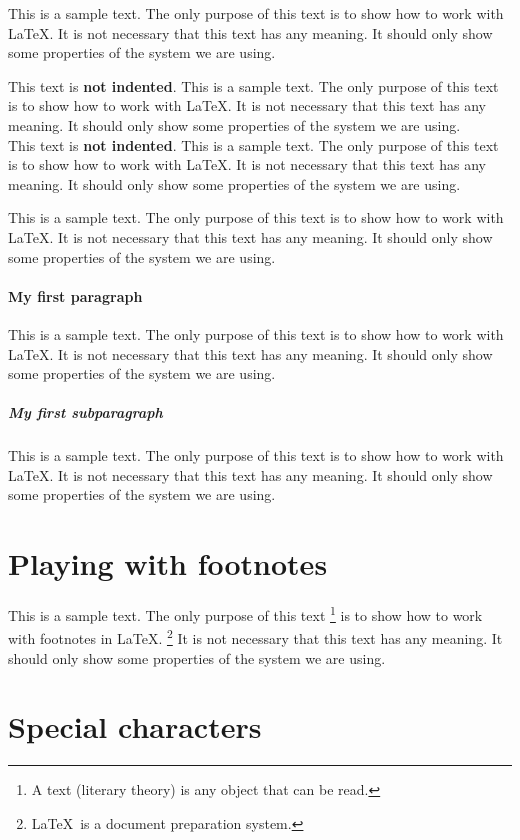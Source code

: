 \documentclass[10pt, paper=a4, abstracton]{scrartcl}
\begin{document}
This is a sample text. The only purpose of this text is to show how to work with \LaTeX . It is not necessary that this text has any meaning. It should only show some properties of the system we are using. 

\noindent This text is \textbf{not indented}. This is a sample text. The only purpose of this text is to show how to work with \LaTeX . It is not necessary that this text has any meaning. It should only show some properties of the system we are using. \\
This text is \textbf{not indented}. This is a sample text. The only purpose of this text is to show how to work with \LaTeX . It is not necessary that this text has any meaning. It should only show some properties of the system we are using. 

This is a sample text. The only purpose of this text is to show how to work with \LaTeX . It is not necessary that this text has any meaning. It should only show some properties of the system we are using. 


\paragraph[First paragraph]{My first paragraph}

This is a sample text. The only purpose of this text is to show how to work with \LaTeX . It is not necessary that this text has any meaning. It should only show some properties of the system we are using. 


\subparagraph[First subparagraph]{My first subparagraph}

This is a sample text. The only purpose of this text is to show how to work with \LaTeX . It is not necessary that this text has any meaning. It should only show some properties of the system we are using. 


\section[Footnotes]{Playing with footnotes}

This is a sample text. The only purpose of this text%
%
\footnote{A text (literary theory) is any object that can be read.} %
%
is to show how to work with footnotes in \LaTeX .%
%
\footnote{\LaTeX\ is a document preparation system.} %
%
It is not necessary that this text has any meaning. It should only show some properties of the system we are using. 


\section{Special characters}
\end{document}

